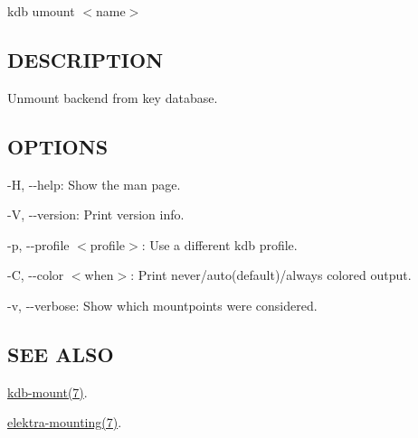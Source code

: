 {\ttfamily kdb umount $<$name$>$}

\subsection*{D\+E\+S\+C\+R\+I\+P\+T\+I\+ON}

Unmount backend from key database.

\subsection*{O\+P\+T\+I\+O\+NS}


\begin{DoxyItemize}
\item {\ttfamily -\/H}, {\ttfamily -\/-\/help}\+: Show the man page.
\item {\ttfamily -\/V}, {\ttfamily -\/-\/version}\+: Print version info.
\item {\ttfamily -\/p}, {\ttfamily -\/-\/profile $<$profile$>$}\+: Use a different kdb profile.
\item {\ttfamily -\/C}, {\ttfamily -\/-\/color $<$when$>$}\+: Print never/auto(default)/always colored output.
\item {\ttfamily -\/v}, {\ttfamily -\/-\/verbose}\+: Show which mountpoints were considered.
\end{DoxyItemize}

\subsection*{S\+EE A\+L\+SO}


\begin{DoxyItemize}
\item \hyperlink{md_doc_help_kdb-mount_doc_help_kdb-mount_md}{kdb-\/mount(7)}.
\item \hyperlink{md_doc_help_elektra-mounting_doc_help_elektra-mounting_md}{elektra-\/mounting(7)}. 
\end{DoxyItemize}